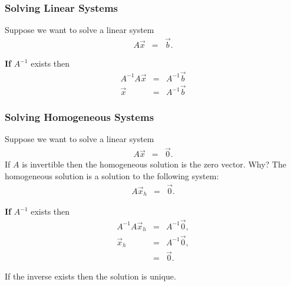 \begin{frame}
  \frametitle{Solving Linear Systems}

  Suppose we want to solve a linear system
  \begin{eqnarray*}
    A \vec{x} & = & \vec{b}.
  \end{eqnarray*}

  \textbf{If} $A^{-1}$ exists then 
  \begin{eqnarray*}
    A^{-1} A \vec{x} & = & A^{-1} \vec{b} \\
    \vec{x} & = & A^{-1} \vec{b}
  \end{eqnarray*}


\end{frame}

\begin{frame}
  \frametitle{Solving Homogeneous Systems}
  {\color{blue}
  Suppose we want to solve a linear system
  \begin{eqnarray*}
    A \vec{x} & = & \vec{0}.
  \end{eqnarray*}
  If $A$ is invertible then the homogeneous solution is the
  zero vector.
  }
  {\color{red}Why?} 
   The homogeneous solution is a solution to the following system:
  \begin{eqnarray*}
    A \vec{x}_h & = & \vec{0}.
  \end{eqnarray*}

  \textbf{If} $A^{-1}$ exists then 
  \begin{eqnarray*}
    A^{-1} A \vec{x}_h & = & A^{-1} \vec{0}, \\
    \vec{x}_h & = & A^{-1} \vec{0}, \\
    & = & \vec{0}.
  \end{eqnarray*}

  {\color{red}If the inverse exists then the solution is unique.}

\end{frame}





